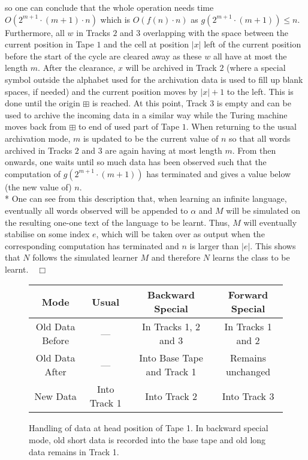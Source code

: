 \documentclass{LMCS}
\theoremstyle{plain}\newtheorem{athm}[thm]{Theorem}
\theoremstyle{plain}\newtheorem{aprop}[thm]{Proposition}
\theoremstyle{plain}\newtheorem{aprob}[thm]{Open Problem}
\theoremstyle{plain}\newtheorem{acor}[thm]{Corollary}
\theoremstyle{plain}\newtheorem{alem}[thm]{Lemma}
\theoremstyle{definition}\newtheorem{adefn}[thm]{Definition}
\theoremstyle{definition}\newtheorem{arem}[thm]{Remark}
\theoremstyle{plain}\newtheorem{aexmp}[thm]{Example}
\theoremstyle{plain}\newtheorem{aclm}[thm]{Claim}
\def\niceqed{~~$\Box$}
\def\sp{\\*\indent}
\begin{document}
so one can conclude that the whole operation needs time
$O(2^{m+1} \cdot (m+1) \cdot n)$ which is $O(f(n) \cdot n)$ as
$g(2^{m+1} \cdot (m+1)) \leq n$. Furthermore, all $w$ in Tracks $2$
and $3$ overlapping with the space between the current position in Tape $1$
and the cell at position $|x|$ left of the current position
before the start of the cycle are cleared away as these $w$ all have
at most the length $m$. After the clearance, $x$ will be archived in
Track $2$ (where a special symbol outside the alphabet used for the
archivation data is used to fill up blank spaces, if needed)
and the current position moves by $|x|+1$ to the left.
This is done until the origin $\boxplus$ is reached.
At this point, Track $3$ is empty and
can be used to archive the incoming data in a similar
way while the Turing machine moves back from $\boxplus$ to end of used
part of Tape $1$.
When returning to the usual archivation
mode, $m$ is updated to be the current value of $n$ so that all words
archived in Tracks $2$ and $3$ are again having at most length $m$.
From then onwards, one waits until so much data has been observed
such that the computation of $g(2^{m+1} \cdot (m+1))$ has terminated
and gives a value below (the new value of) $n$.
\sp
One can see from this description 
that, when learning an infinite language,
eventually all words observed will be appended to $\alpha$ and
$M$ will be simulated on the resulting one-one text of the language to
be learnt. Thus, $M$ will eventually stabilise on some index $e$, which will
be taken over as output when the corresponding computation has terminated
and $n$ is larger than $|e|$. This shows that $N$ follows the simulated
learner $M$ and therefore $N$ learns the class to be learnt.\niceqed

\begin{figure}[t]
\begin{center}
\begin{tabular}{|c|c|c|c|} \hline
Mode     & Usual & Backward Special & Forward Special \\ \hline
Old Data Before & ---   & In Tracks 1, 2 and 3 & In Tracks 1 and 2 \\ \hline
Old Data After  & ---   & Into Base Tape and Track 1 &
  Remains unchanged \\ \hline
New Data        & Into Track 1 & Into Track 2 & Into Track 3 \\ \hline
\end{tabular}
\end{center}
\caption{Handling of data at head position of Tape 1. In backward special
mode, old short data is recorded into 
the base tape and old long data remains in Track 1.}
\label{figuretrackexplain}
\end{figure}
\end{document}
